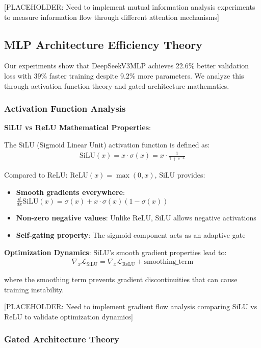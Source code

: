 \documentclass[11pt,a4paper]{article}
\begin{document}
[PLACEHOLDER: Need to implement mutual information analysis experiments to measure information flow through different attention mechanisms]

\subsection{MLP Architecture Efficiency Theory}

Our experiments show that DeepSeekV3MLP achieves 22.6\% better validation loss with 39\% faster training despite 9.2\% more parameters. We analyze this through activation function theory and gated architecture mathematics.

\subsubsection{Activation Function Analysis}

\textbf{SiLU vs ReLU Mathematical Properties}:

The SiLU (Sigmoid Linear Unit) activation function is defined as:
\begin{align}
\text{SiLU}(x) = x \cdot \sigma(x) = x \cdot \frac{1}{1 + e^{-x}}
\end{align}

Compared to ReLU: $\text{ReLU}(x) = \max(0, x)$, SiLU provides:

\begin{itemize}
    \item \textbf{Smooth gradients everywhere}: $\frac{d}{dx}\text{SiLU}(x) = \sigma(x) + x \cdot \sigma(x)(1-\sigma(x))$
    \item \textbf{Non-zero negative values}: Unlike ReLU, SiLU allows negative activations
    \item \textbf{Self-gating property}: The sigmoid component acts as an adaptive gate
\end{itemize}

\textbf{Optimization Dynamics}:
SiLU's smooth gradient properties lead to:
\begin{align}
\nabla_x \mathcal{L}_{\text{SiLU}} = \nabla_x \mathcal{L}_{\text{ReLU}} + \text{smoothing\_term}
\end{align}

where the smoothing term prevents gradient discontinuities that can cause training instability.

[PLACEHOLDER: Need to implement gradient flow analysis comparing SiLU vs ReLU to validate optimization dynamics]

\subsubsection{Gated Architecture Theory}
\end{document}
